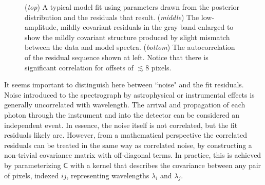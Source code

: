 \documentclass[iop,floatfix]{emulateapj}
\newcommand{\vC}{\mathsf{C}}
\begin{document}
\begin{figure}[!htb]
\begin{center}
  \caption{ ({\it top}) A typical model fit using 
  parameters drawn from the posterior distribution and the residuals that
  result. ({\it middle}) The low-amplitude, mildly covariant residuals in the gray band enlarged
  to show the mildly covariant structure produced by slight mismatch between
  the data and model spectra. ({\it bottom}) The autocorrelation of the
residual sequence shown at left. Notice that there is significant correlation
for offsets of $\lesssim 8$ pixels.}
\label{fig:class0}
\end{center}
\end{figure}

It seems important to distinguish here between ``noise" and the fit residuals.  Noise introduced to 
the spectrograph by astrophysical or instrumental effects is generally uncorrelated with 
wavelength.  The arrival and propagation of each photon through the instrument and into the 
detector can be considered an independent event.  In essence, the noise itself is not correlated, 
but the fit residuals likely are.  However, from a mathematical perspective the correlated 
residuals can be treated in the same way as correlated noise, by constructing a non-trivial 
covariance matrix with off-diagonal terms.  In practice, this is achieved by parameterizing $\vC$ 
with a kernel that describes the covariance between any pair of pixels, indexed $ij$, representing 
wavelengths $\lambda_i$ and $\lambda_j$.
\end{document}

